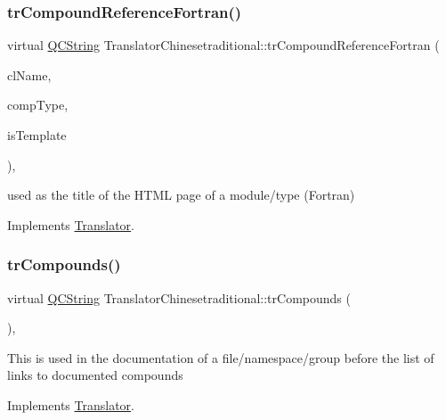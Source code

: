 \subsubsection{\texorpdfstring{trCompoundReferenceFortran()}{trCompoundReferenceFortran()}}
{\footnotesize\ttfamily virtual \mbox{\hyperlink{class_q_c_string}{Q\+C\+String}} Translator\+Chinesetraditional\+::tr\+Compound\+Reference\+Fortran (\begin{DoxyParamCaption}\item[{const char $\ast$}]{cl\+Name,  }\item[{\mbox{\hyperlink{class_class_def_ae70cf86d35fe954a94c566fbcfc87939}{Class\+Def\+::\+Compound\+Type}}}]{comp\+Type,  }\item[{bool}]{is\+Template }\end{DoxyParamCaption})\hspace{0.3cm}{\ttfamily [inline]}, {\ttfamily [virtual]}}

used as the title of the H\+T\+ML page of a module/type (Fortran) 

Implements \mbox{\hyperlink{class_translator}{Translator}}.

\mbox{\label{class_translator_chinesetraditional_a209bcee5ed6aa0f9115fa0a72b836680}} 
\subsubsection{\texorpdfstring{trCompounds()}{trCompounds()}}
{\footnotesize\ttfamily virtual \mbox{\hyperlink{class_q_c_string}{Q\+C\+String}} Translator\+Chinesetraditional\+::tr\+Compounds (\begin{DoxyParamCaption}{ }\end{DoxyParamCaption})\hspace{0.3cm}{\ttfamily [inline]}, {\ttfamily [virtual]}}

This is used in the documentation of a file/namespace/group before the list of links to documented compounds 

Implements \mbox{\hyperlink{class_translator}{Translator}}.

\mbox{\label{class_translator_chinesetraditional_ad4481567c4ff9e4a01302ae6aa3a34e3}} 
